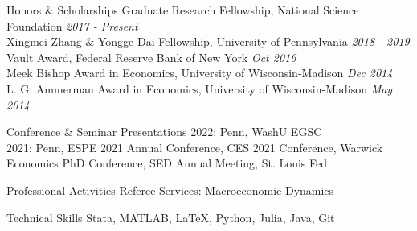 \documentclass{resume}
\begin{document}
\pagebreak

\begin{rSection}{Honors \& Scholarships}
Graduate Research Fellowship, National Science Foundation \hfill {\em 2017 - Present} \vspace{1pt}\\
Xingmei Zhang \& Yongge Dai Fellowship, University of Pennsylvania \hfill {\em 2018 - 2019} \vspace{1pt}\\
Vault Award, Federal Reserve Bank of New York \hfill {\em Oct 2016} \vspace{1pt}\\
Meek Bishop Award in Economics, University of Wisconsin-Madison \hfill {\em Dec 2014} \vspace{1pt}\\
L. G. Ammerman Award in Economics, University of Wisconsin-Madison \hfill {\em May 2014} \vspace{0pt}
\end{rSection}

\begin{rSection}{Conference \& Seminar Presentations}
2022: Penn, WashU EGSC \vspace{1pt}\\
2021: Penn, ESPE 2021 Annual Conference, CES 2021 Conference, Warwick Economics PhD Conference, SED Annual Meeting, St. Louis Fed
\end{rSection}

\begin{rSection}{Professional Activities}
Referee Services: Macroeconomic Dynamics
\end{rSection}

\begin{rSection}{Technical Skills}
Stata, MATLAB, \LaTeX, Python, Julia, Java, Git
\end{rSection}
\end{document}
